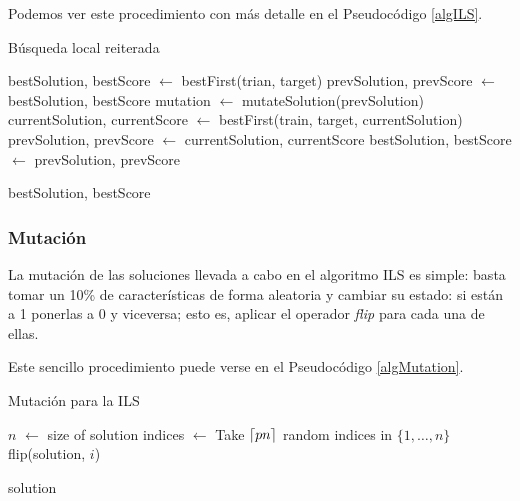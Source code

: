 \documentclass[a4paper, 11pt, titlepage]{article}
\begin{document}
    Podemos ver este procedimiento con más detalle en el Pseudocódigo \ref{algILS}.

    \begin{algorithm}
        \caption{Búsqueda local reiterada}\label{algILS}
        \begin{algorithmic}[1]
            \State bestSolution, bestScore $\gets$ bestFirst(trian, target)
            \State prevSolution, prevScore $\gets$ bestSolution, bestScore
                \State mutation $\gets$ mutateSolution(prevSolution)
                \State currentSolution, currentScore $\gets$ bestFirst(train, target, currentSolution)
                \State prevSolution, prevScore $\gets$ currentSolution, currentScore
                \EndIf
                \State bestSolution, bestScore $\gets$ prevSolution, prevScore
                \EndIf
            \EndFor

            \State \Return bestSolution, bestScore
            \EndFunction
        \end{algorithmic}
    \end{algorithm}

    \subsubsection*{Mutación}

    La mutación de las soluciones llevada a cabo en el algoritmo ILS es simple: basta tomar un 10\% de características de forma aleatoria y cambiar su estado: si están a 1 ponerlas a 0 y viceversa; esto es, aplicar el operador \emph{flip} para cada una de ellas.

    Este sencillo procedimiento puede verse en el Pseudocódigo \ref{algMutation}.

    \begin{algorithm}
        \caption{Mutación para la ILS}\label{algMutation}
        \begin{algorithmic}[1]
            \State $n$ $\gets$ size of solution
            \State indices $\gets$ Take $\lceil pn\rceil$ random indices in $\{1,\dots,n\}$
                \State flip(solution, $i$)
            \EndFor

            \State \Return solution
            \EndFunction
        \end{algorithmic}
    \end{algorithm}
\end{document}
